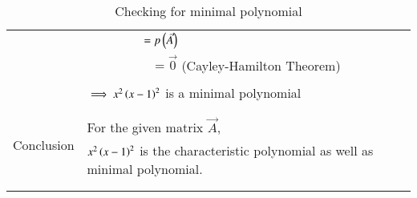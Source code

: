 \documentclass[journal,12pt]{IEEEtran}
\begin{document}
\begin{longtable}{|c|l|}
	& $\qquad \qquad \quad=p\left(\Vec{A}\right)$\\
	&$\qquad\qquad\quad=\vec{0}$ (Cayley-Hamilton Theorem)\\
	&\\
	&$\implies x^2\left(x-1\right)^2$ is a minimal polynomial\\
	&\\
	\hline
	\multirow{3}{*}{Conclusion} & \\
	& For the given matrix $\Vec{A}$,\\
	&$x^2\left(x-1\right)^2$ is the characteristic polynomial as well as minimal polynomial.\\
	&\\
	\hline
	\caption{Checking for minimal polynomial}
    \label{table:2}
\end{longtable}
\end{document}
